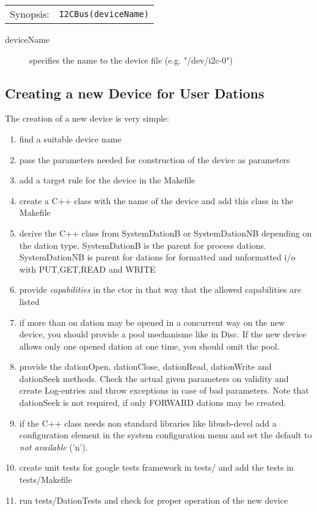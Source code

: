 \begin{tabular}{ll}
Synopsis: & \verb|I2CBus(deviceName)|\\ 
\end{tabular}

\begin{description}
\item[deviceName] specifies the name to the device file (e.g. "/dev/i2c-0")
\end{description}

\subsection{Creating a new Device for User Dations}
The creation of a new device is very simple:
\begin{enumerate}
\item find a suitable device name
\item pass the parameters needed for construction of the device as
      parameters
\item add a target rule for the device in the Makefile
\item create a C++ class with the name of the device and add this class
      in the Makefile
\item derive the C++ class from SystemDationB or SystemDationNB depending
      on the dation type. SystemDationB is the parent for process dations.
      SystemDationNB is parent for dations for formatted and unformatted
      i/o with PUT,GET,READ and WRITE
\item provide {\em capabilities} in the ctor in that way that the allowed
      capabilities are listed
\item if more than on dation may be opened in a concurrent way on the new
      device, you should provide a pool mechanisme like in Disc.
      If the new device allows only one opened dation at one time, you 
      should omit the pool.
\item provide the dationOpen, dationClose, dationRead, dationWrite 
      and dationSeek methods. Check the actual given parameters on
      validity and create Log-entries and throw exceptions in case
      of bad parameters.
      Note that dationSeek is not required, if only FORWARD dations
      may be created.
\item if the C++ class needs non standard libraries like libusb-devel
      add a configuration element in the system configuration menu
      and set the default to {\em not available} ('n').
\item create unit tests for google tests framework in tests/ and add the
      tests in tests/Makefile
\item run tests/DationTests and check for proper operation of the new device
\end{enumerate}

